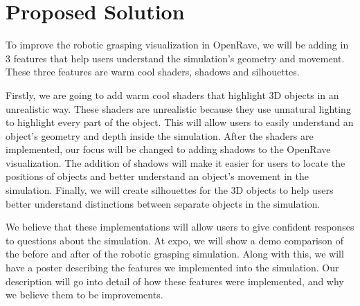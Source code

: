 \documentclass[10pt,journal,compsoc]{IEEEtran}
\begin{document}
\section{Proposed Solution}
To improve the robotic grasping visualization in OpenRave, we will be adding in 3 features that help users understand the simulation's geometry and movement. 
These three features are warm cool shaders, shadows and silhouettes. \par

Firstly, we are going to add warm cool shaders that highlight 3D objects in an unrealistic way. 
These shaders are unrealistic because they use unnatural lighting to highlight every part of the object. 
This will allow users to easily understand an object's geometry and depth inside the simulation.
After the shaders are implemented, our focus will be changed to adding shadows to the OpenRave visualization. 
The addition of shadows will make it easier for users to locate the positions of objects and better understand an object's movement in the simulation. 
Finally, we will create silhouettes for the 3D objects to help users better understand distinctions between separate objects in the simulation. \par

We believe that these implementations will allow users to give confident responses to questions about the simulation.
At expo, we will show a demo comparison of the before and after of the robotic grasping simulation. 
Along with this, we will have a poster describing the features we implemented into the simulation. 
Our description will go into detail of how these features were implemented, and why we believe them to be improvements.
\end{document}
